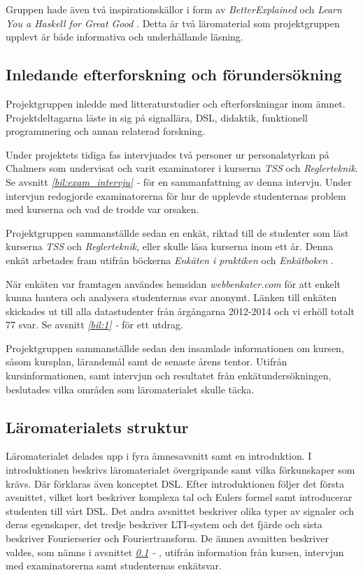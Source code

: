 \documentclass[12pt,a4paper,twoside,openright]{article}
\begin{document}
Gruppen hade även två inspirationskällor i form av
\textit{BetterExplained} \cite{betterexplained} och \textit{Learn You a Haskell for Great Good} \cite{learnyouahaskell}.
Detta är två läromaterial som projektgruppen upplevt är både
informativa och underhållande läsning.

\subsection{Inledande efterforskning och förundersökning}
\label{sec:efterforskning}

Projektgruppen inledde med litteraturstudier och efterforskningar inom
ämnet. Projektdeltagarna läste in sig på signallära, DSL, didaktik,
funktionell programmering och annan relaterad forskning.

Under projektets tidiga fas intervjuades två personer ur
personalstyrkan på Chalmers som undervisat och varit examinatorer i
kurserna \textit{TSS} och \textit{Reglerteknik}.
Se avsnitt \textit{\ref{bil:exam_intervju} - } för en sammanfattning av denna
intervju. Under intervjun redogjorde examinatorerna för hur de
upplevde studenternas problem med kurserna och vad de trodde var
orsaken.

Projektgruppen sammanställde sedan en enkät, riktad till de studenter
som läst kurserna \textit{TSS} och \textit{Reglerteknik}, eller skulle
läsa kurserna inom ett år. Denna enkät arbetades fram utifrån böckerna
\textit{Enkäten i praktiken} \cite{enkaten_i_praktiken} och \textit{Enkätboken} \cite{enkatboken}.

När enkäten var framtagen användes hemsidan \textit{webbenkater.com} för att
enkelt kunna hantera och analysera studenternas svar anonymt.
Länken till enkäten skickades ut till alla datastudenter från
årgångarna 2012-2014 och vi erhöll totalt 77 svar. Se avsnitt
\textit{\ref{bil:1} - } för ett utdrag.

Projektgruppen sammanställde sedan den insamlade informationen om
kursen, såsom kursplan, lärandemål samt de senaste årens
tentor. Utifrån kursinformationen, samt intervjun och resultatet från
enkätundersökningen, beslutades vilka områden som läromaterialet
skulle täcka.

\subsection{Läromaterialets struktur}
\label{sec:struktur}
Läromaterialet delades upp i fyra ämnesavsnitt samt en introduktion. I
introduktionen beskrivs läromaterialet övergripande samt vilka
förkunskaper som krävs. Där förklaras även konceptet DSL. Efter
introduktionen följer det första avsnittet, vilket kort beskriver
komplexa tal och Eulers formel samt introducerar studenten till vårt
DSL. Det andra avsnittet beskriver olika typer av signaler och deras
egenskaper, det tredje beskriver LTI-system och det fjärde och sista
beskriver Fourierserier och Fouriertransform. De ämnen avsnitten
beskriver valdes, som nämns i avsnittet \textit{\ref{sec:efterforskning} - }, utifrån information från
kursen, intervjun med examinatorerna samt studenternas enkätsvar.
\end{document}
